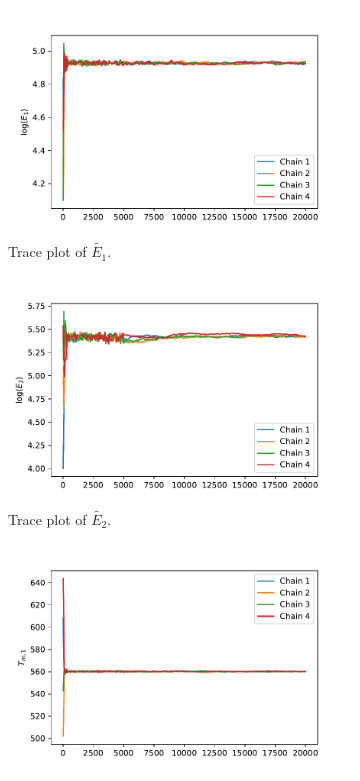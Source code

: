 \begin{figure}[h!]
\begin{subfigure}{0.5\textwidth}
\centering
\includegraphics[width=\linewidth]{figures/bayesian/2_reactions/mass/trace_plot_E1.pdf}
\caption{Trace plot of $\tilde{E_1}$.}
\label{traceE1}
\end{subfigure}%
\begin{subfigure}{0.5\textwidth}
\centering
\includegraphics[width=\linewidth]{figures/bayesian/2_reactions/mass/trace_plot_E2.pdf}
\caption{Trace plot of $\tilde{E_2}$.}
\label{traceE2}
\end{subfigure}
\newline
\begin{subfigure}{0.5\textwidth}
\centering
\includegraphics[width=\linewidth]{figures/bayesian/2_reactions/mass/trace_plot_Tm1.pdf}

\end{subfigure}
\end{figure}
